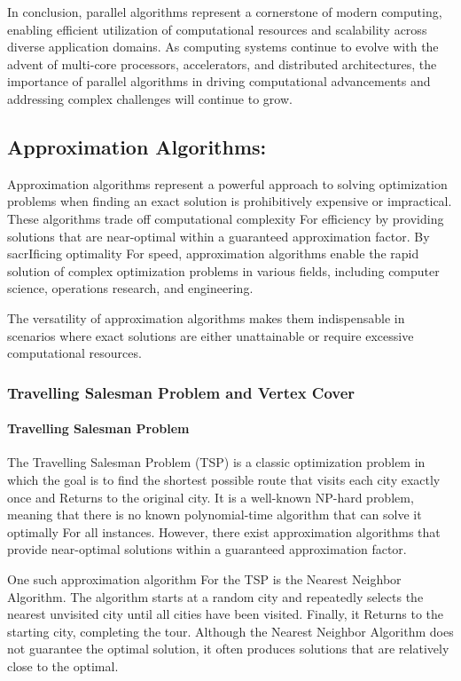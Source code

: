 \documentclass[12pt]{book} %
\begin{document}
In conclusion, parallel algorithms represent a cornerstone of modern computing, enabling efficient utilization of computational resources and scalability across diverse application domains. As computing systems continue to evolve with the advent of multi-core processors, accelerators, and distributed architectures, the importance of parallel algorithms in driving computational advancements and addressing complex challenges will continue to grow.


\subsection{Approximation Algorithms:}

Approximation algorithms represent a powerful approach to solving optimization problems when finding an exact solution is prohibitively expensive or impractical. These algorithms trade off computational complexity For efficiency by providing solutions that are near-optimal within a guaranteed approximation factor. By sacrIficing optimality For speed, approximation algorithms enable the rapid solution of complex optimization problems in various fields, including computer science, operations research, and engineering.

The versatility of approximation algorithms makes them indispensable in scenarios where exact solutions are either unattainable or require excessive computational resources.

\subsubsection{Travelling Salesman Problem and Vertex Cover}
\paragraph{Travelling Salesman Problem}
The Travelling Salesman Problem (TSP) is a classic optimization problem in which the goal is to find the shortest possible route that visits each city exactly once and Returns to the original city. It is a well-known NP-hard problem, meaning that there is no known polynomial-time algorithm that can solve it optimally For all instances. However, there exist approximation algorithms that provide near-optimal solutions within a guaranteed approximation factor.

One such approximation algorithm For the TSP is the Nearest Neighbor Algorithm. The algorithm starts at a random city and repeatedly selects the nearest unvisited city until all cities have been visited. Finally, it Returns to the starting city, completing the tour. Although the Nearest Neighbor Algorithm does not guarantee the optimal solution, it often produces solutions that are relatively close to the optimal.
\end{document}
